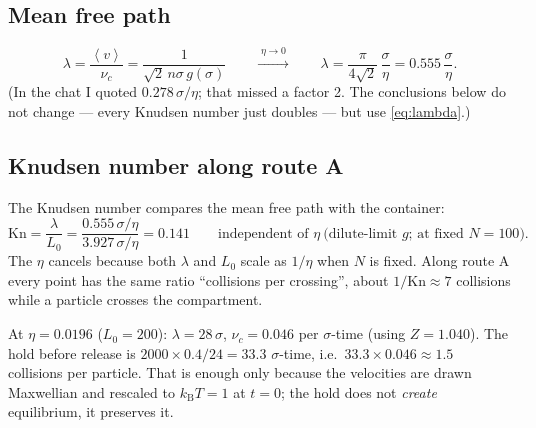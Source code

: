\documentclass[11pt,a4paper]{article}
\newcommand{\kT}{k_{\mathrm B}T}
\newcommand{\ie}{i.e.\ }
\newcommand{\avg}[1]{\left\langle #1 \right\rangle}
\begin{document}
\subsection{Mean free path}
\begin{equation}
\lambda = \frac{\avg v}{\nu_c} = \frac{1}{\sqrt2\, n\sigma\, g(\sigma)}
\qquad\xrightarrow{\;\eta\to0\;}\qquad
\lambda = \frac{\pi}{4\sqrt2}\,\frac{\sigma}{\eta} = 0.555\,\frac{\sigma}{\eta}.
\label{eq:lambda}
\end{equation}
(In the chat I quoted $0.278\,\sigma/\eta$; that missed a factor 2. The conclusions below do not change --- every Knudsen number just doubles --- but use \eqref{eq:lambda}.)

\subsection{Knudsen number along route A}
The Knudsen number compares the mean free path with the container:
\begin{equation}
\mathrm{Kn} = \frac{\lambda}{L_0} = \frac{0.555\,\sigma/\eta}{3.927\,\sigma/\eta} = 0.141
\qquad\text{independent of }\eta\ \text{(dilute-limit }g\text{; at fixed }N=100).
\label{eq:Kn}
\end{equation}
The $\eta$ cancels because both $\lambda$ and $L_0$ scale as $1/\eta$ when $N$ is fixed. Along route A every point has the same ratio ``collisions per crossing'', about $1/\mathrm{Kn} \approx 7$ collisions while a particle crosses the compartment.

\begin{worked}
At $\eta = 0.0196$ ($L_0 = 200$): $\lambda = 28\,\sigma$, $\nu_c = 0.046$ per $\sigma$-time (using $Z = 1.040$). The hold before release is $2000\times0.4/24 = 33.3$ $\sigma$-time, \ie $33.3\times0.046 \approx 1.5$ collisions per particle. That is enough only because the velocities are drawn Maxwellian and rescaled to $\kT = 1$ at $t = 0$; the hold does not \emph{create} equilibrium, it preserves it.
\end{worked}
\end{document}
